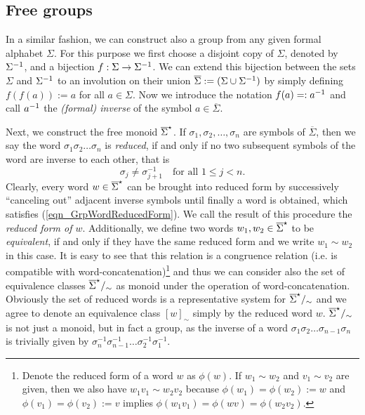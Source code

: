 \subsection{Free groups}
In a similar fashion, we can construct also a group from any given formal alphabet $\Sigma$. For this purpose we first choose a disjoint copy of $\Sigma$, denoted by ${\Sigma}^{-1}$, and a bijection $f : \Sigma \to {\Sigma}^{-1}$. We can extend this bijection between the sets $\Sigma$ and ${\Sigma}^{-1}$ to an involution on their union $\overline{\Sigma} := (\Sigma \cup {\Sigma}^{-1})$ by simply defining $f(f(a)) := a$ for all $a \in \Sigma$. Now we introduce the notation $f(a) =: {a}^{-1}$ and call ${a}^{-1}$ the \emph{(formal) inverse} of the symbol $a \in \overline{\Sigma}$.

Next, we construct the free monoid ${\overline{\Sigma}}^{\star}$. If $\sigma_1, \sigma_2, \dots, \sigma_n$ are symbols of $\overline{\Sigma}$, then we say the word $\sigma_1 \sigma_2 \dots \sigma_n$ is \emph{reduced}, if and only if no two subsequent symbols of the word are inverse to each other, that is
\begin{equation}
\label{eqn_GrpWordReducedForm}
 \sigma_j \ne \sigma_{j+1}^{-1} \quad \text{for all } 1 \le j < n.
\end{equation}
Clearly, every word $w \in {\overline{\Sigma}}^{\star}$ can be brought into reduced form by successively ``canceling out'' adjacent inverse symbols until finally a word is obtained, which satisfies (\ref{eqn_GrpWordReducedForm}). We call the result of this procedure the \emph{reduced form of $w$}. Additionally, we define two words $w_1, w_2 \in {\overline{\Sigma}}^{\star}$ to be \emph{equivalent}, if and only if they have the same reduced form and we write $w_1 \sim w_2$ in this case. It is easy to see that this relation is a congruence relation (i.e. is compatible with word-concatenation)\footnote{Denote the reduced form of a word $w$ as $\phi(w)$. If $w_1 \sim w_2$ and $v_1 \sim v_2$ are given, then we also have $w_1 v_1 \sim w_2 v_2$ because $\phi(w_1) = \phi(w_2) := w$ and $\phi(v_1) = \phi(v_2) := v$ implies $\phi(w_1 v_1) = \phi(w v) = \phi(w_2 v_2)$.} and thus we can consider also the set of equivalence classes ${\overline{\Sigma}}^{\star}/_{\sim}$ as monoid under the operation of word-concatenation. Obviously the set of reduced words is a representative system for ${\overline{\Sigma}}^{\star}/_{\sim}$ and we agree to denote an equivalence class $[w]_{\sim}$ simply by the reduced word $w$. ${\overline{\Sigma}}^{\star}/_{\sim}$ is not just a monoid, but in fact a group, as the inverse of a word $\sigma_1 \sigma_2 \dots \sigma_{n-1} \sigma_n$ is trivially given by $\sigma_n^{-1} \sigma_{n-1}^{-1} \dots \sigma_2^{-1} \sigma_1^{-1}$. 
